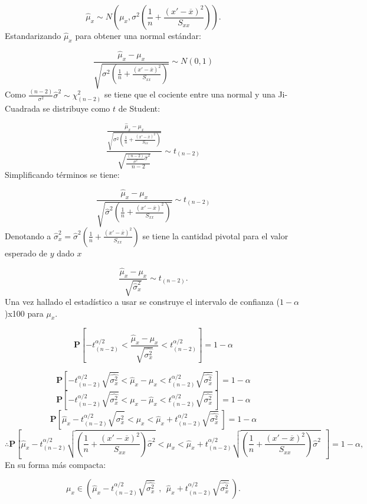 \documentclass[
  a4paper,
  oneside,
  openany]{book}
\begin{document}
\[\hat{\mu}_{x}\sim N\left(\mu_{x},\sigma^2\left( \frac{1}{n}+\frac{(x'-\overline{x})^2}{S_{xx}}\right)\right).\]
Estandarizando \(\hat{\mu}_{x}\) para obtener una normal estándar:

\[\frac{\hat{\mu}_{x}-\mu_{x}}{\sqrt{\sigma^2\left( \frac{1}{n}+\frac{(x'-\overline{x})^2}{S_{xx}}\right)}}\sim N(0,1)\]
Como \(\frac{(n-2)}{\sigma^2}\hat{\sigma}^2\sim\chi^2_{(n-2)}\) se tiene que el cociente entre una normal y una Ji-Cuadrada se distribuye como \(t\) de Student:

\[\frac{\frac{\hat{\mu}_{x}-\mu_{x}}{\sqrt{\sigma^2\left( \frac{1}{n}+\frac{(x'-\overline{x})^2}{S_{xx}}\right)}}}{\sqrt{\frac{\frac{(n-2)}{\sigma^2}\hat{\sigma}^2}{n-2}}}\sim t_{(n-2)}\]
Simplificando términos se tiene:

\[\frac{\hat{\mu}_{x}-\mu_{x}}{\sqrt{\hat{\sigma}^2\left( \frac{1}{n}+\frac{(x'-\overline{x})^2}{S_{xx}}\right)}}\sim t_{(n-2)}\]
Denotando a \(\hat{\sigma}_{x}^2=\hat{\sigma}^2\left(\frac{1}{n}+\frac{(x'-\overline{x})^2}{S_{xx}}\right)\) se tiene la cantidad pivotal para el valor esperado de \(y\) dado \(x\)

\[\frac{\hat{\mu}_{x}-\mu_{x}}{\sqrt{\hat{\sigma}_{x}^2}}\sim t_{(n-2)}.\]
Una vez hallado el estadístico a usar se construye el intervalo de confianza (\(1-\alpha\))x100 para \(\mu_{x}\).

\[\mathbf{P}\left[-t_{(n-2)}^{\alpha/2} < \frac{\hat{\mu}_{x}-\mu_{x}}{\sqrt{\hat{\sigma_{x}^2}}} < t_{(n-2)}^{\alpha/2}\right]=1-\alpha\]

\[\mathbf{P}\left[-t_{(n-2)}^{\alpha/2}\sqrt{\hat{\sigma_{x}^2}}<\hat{\mu}_{x}-\mu_{x}<t_{(n-2)}^{\alpha/2}\sqrt{\hat{\sigma_{x}^2}} \ \right]=1-\alpha\]
\[\mathbf{P}\left[-t_{(n-2)}^{\alpha/2}\sqrt{\hat{\sigma_{x}^2}}<\mu_{x}-\hat{\mu}_{x}<t_{(n-2)}^{\alpha/2}\sqrt{\hat{\sigma_{x}^2}} \ \right]=1-\alpha\]
\[\mathbf{P}\left[\hat{\mu}_{x}-t_{(n-2)}^{\alpha/2}\sqrt{\hat{\sigma_{x}^2}}<\mu_{x}<\hat{\mu}_{x}+t_{(n-2)}^{\alpha/2}\sqrt{\hat{\sigma_{x}^2}} \ \right]=1-\alpha\]
\[\therefore \mathbf{P}\left[\hat{\mu}_{x}-t_{(n-2)}^{\alpha/2}\sqrt{\left( \frac{1}{n}+\frac{(x'-\overline{x})^2}{S_{xx}}\right)\hat{\sigma}^2}<\mu_{x}<\hat{\mu}_{x}+t_{(n-2)}^{\alpha/2}\sqrt{\left( \frac{1}{n}+\frac{(x'-\overline{x})^2}{S_{xx}}\right)\hat{\sigma}^2} \ \ \right]=1-\alpha,\]
En su forma más compacta:

\[\mu_{x} \in \left(\hat{\mu}_{x}-t_{(n-2)}^{\alpha/2}\sqrt{\hat{\sigma_{x}^2}} \ \ , \ \ \hat{\mu}_{x}+t_{(n-2)}^{\alpha/2}\sqrt{\hat{\sigma_{x}^2}} \ \right).\]
\end{document}
